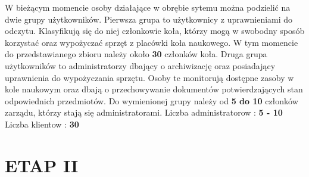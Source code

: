 \documentclass{article}
\begin{document}
    W bieżącym momencie osoby działające w obrębie sytemu można podzielić na dwie grupy użytkowników. Pierwsza grupa to użytkownicy z uprawnieniami do odczytu. Klasyfikują się do niej członkowie koła, którzy mogą w swobodny sposób korzystać oraz wypożyczać sprzęt z placówki koła naukowego. W tym momencie do przedstawianego zbioru należy około \textbf{30} członków koła. Druga grupa użytkowników to administratorzy dbający o archiwizację oraz posiadający uprawnienia do wypożyczania sprzętu. Osoby
    te monitorują dostępne zasoby w kole naukowym oraz dbają o przechowywanie dokumentów potwierdzających stan odpowiednich przedmiotów. Do wymienionej grupy należy od \textbf{5 do 10} członków zarządu, którzy stają się administratorami. \newline
    Liczba administratorow : \textbf{5 - 10} \newline
    Liczba klientow : \textbf{30}
    
\section{\textbf{ETAP II}}
\end{document}
